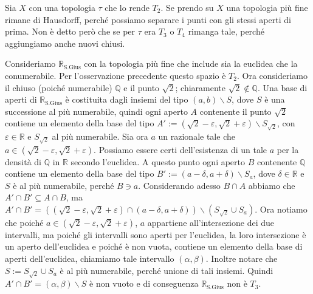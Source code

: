 \begin{example}[\(T_{2} \) non \( T_{3}\) ]
    Sia \(X\) con una topologia \(\tau\) che lo rende \(T_{2}\). Se prendo su
    \(X\) una topologia più fine rimane di Hausdorff, perché possiamo separare i
    punti con gli stessi aperti di prima. Non è detto però che se per \(\tau\)
    era \(T_{3}\) o \(T_{4}\) rimanga tale, perché aggiungiamo anche nuovi
    chiusi.

    Consideriamo \(\mathbb{R}_\text{S.Gius}\) con la topologia più fine che
    include sia la euclidea che la conumerabile. Per l'osservazione precedente questo spazio è \(T_{2}\). Ora
    consideriamo il chiuso (poiché numerabile) \(\mathbb{Q}\) e il punto
    \(\sqrt{2}\); chiaramente \(\sqrt{2} \not\in \mathbb{Q}\).
    Una base di aperti di \(\mathbb{R}_\text{S.Gius} \) è costituita dagli
    insiemi del tipo \((a, b) \smallsetminus S\), dove \(S\) è una successione
    al più numerabile, quindi ogni aperto \(A\) contenente il punto \(\sqrt{2}\)
    contiene un elemento della base del tipo
    \(A' := (\sqrt{2} - \varepsilon, \sqrt{2} + \varepsilon) \smallsetminus
    S_{\sqrt{2}}\), con
    \(\varepsilon \in \mathbb{R}\) e \(S_{\sqrt{2}}\) al più numerabile. Sia ora
    \(a\) un razionale tale che \(a \in (\sqrt{2} - \varepsilon, \sqrt{2} +
    \varepsilon)\). Possiamo essere certi dell'esistenza di un tale \(a\)  per la
    densità di \(\mathbb{Q}\) in \(\mathbb{R}\) secondo l'euclidea. A questo
    punto ogni aperto \(B\) contenente \(\mathbb{Q}\) contiene un elemento della base
    del tipo \(B' := (a - \delta, a + \delta) \smallsetminus S_a\), dove \(\delta \in
    \mathbb{R}\) e \(S\) è al più numerabile, perché \(B \ni a\). Considerando
    adesso \(B \cap A\) abbiamo che \(A' \cap  B' \subseteq A \cap B \), ma \(A'
    \cap B' = ((\sqrt{2} - \varepsilon, \sqrt{2} + \varepsilon) \cap (a -
    \delta, a + \delta)) \smallsetminus (S_{\sqrt{2}} \cup S_a )\). Ora notiamo
    che poiché \(a \in (\sqrt{2} - \varepsilon, \sqrt{2} + \varepsilon)\), \(a\)
    appartiene all'intersezione dei due intervalli, ma poiché gli intervalli
    sono aperti per l'euclidea, la loro intersezione è un aperto dell'euclidea e
    poiché è non vuota, contiene un elemento della base di aperti dell'euclidea,
    chiamiamo tale intervallo \((\alpha, \beta)\).
    Inoltre notare che \(S := S_{\sqrt{2}} \cup S_a\) è al più
    numerabile, perché unione di tali insiemi.
    Quindi \(A' \cap B' = (\alpha, \beta) \smallsetminus S\) è non vuoto e di
    conseguenza \(\mathbb{R}_\text{S.Gius} \) non è \(T_{3}\).
\end{example}

